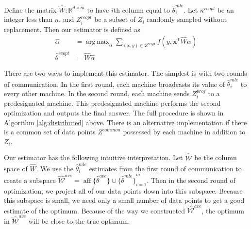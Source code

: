 \documentclass[twoside]{article}
\DeclareMathOperator*{\argmax}{arg\,max}
\DeclareMathOperator*{\affspan}{aff}
\newcommand{\W}{\mathcal{\hat W}}
\newcommand{\Wave}{{\mathcal{\hat W}^{ave}}}
\newcommand{\x}{\mathbf{x}}
\newcommand{\w}{\theta}
\newcommand{\wreopt}{\hat\w^{reopt}}
\newcommand{\wave}{\hat\w^{ave}}
\newcommand{\wmle}{\hat\w^{mle}}
\newcommand{\wstar}{{\w^{*}}}
\newcommand{\trans}[1]{\ensuremath{{#1}^{\mathsf{T}}}}
\begin{document}
Define the matrix $\hat W : \mathbb{R}^{d\times m}$ to have $i$th column equal to $\wmle_i$.
Let $n^{reopt}$ be an integer less than $n$,
and $Z^{reopt}_i$ be a subset of $Z_i$ randomly sampled without replacement.
Then our estimator is defined as
\begin{equation}
\begin{aligned}
\hat\alpha &= \argmax_\alpha \sum _{(\x,y)\in Z^{reopt}} f\left(y,\trans\x \hat W\alpha \right)
\\
\wreopt &= \hat W \hat\alpha
\end{aligned}
\end{equation}

There are two ways to implement this estimator.
The simplest is with two rounds of communication.
In the first round, each machine broadcasts its value of $\wmle_i$ to every other machine.
In the second round, each machine sends $Z_i^{proj}$ to a predesignated machine.
This predesignated machine performs the second optimization and outputs the final answer.
The full procedure is shown in Algorithm \ref{alg:distributed} above.
There is an alternative implementation if there is a common set of data points $Z^{common}$ possessed by each machine in addition to $Z_i$.

Our estimator has the following intuitive interpretation.
Let $\W$ be the column space of $\hat W$.
We use the $\wmle_i$ estimates from the first round of communication to create a subspace $\Wave=\affspan\{\wave\}\cup{\{\wmle\}}_{i=1}^m$.
Then in the second round of optimization, we project all of our data points down into this subspace.
Because this subspace is small, we need only a small number of data points to get a good estimate of the optimum.
Because of the way we constructed $\Wave$,
the optimum in $\Wave$ will be close to the true optimum.
\end{document}
